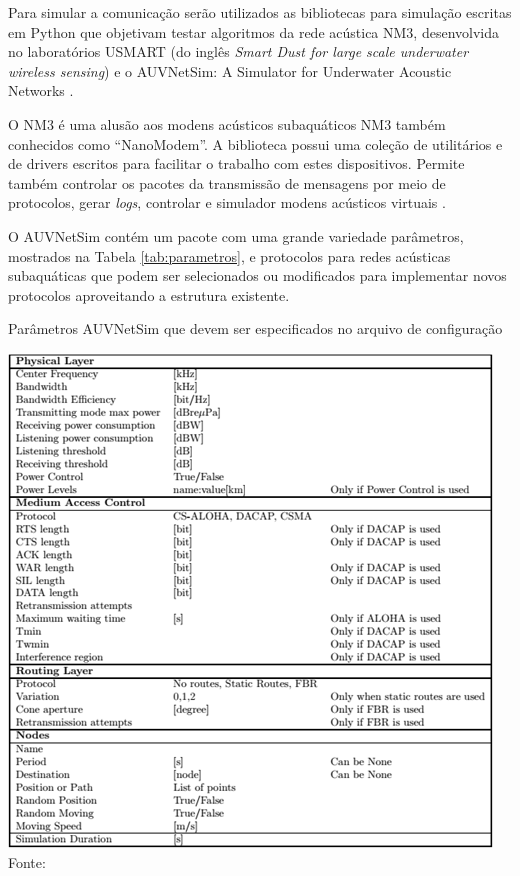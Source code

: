 Para simular a comunicação serão utilizados as bibliotecas para simulação escritas em Python que objetivam testar algoritmos da rede acústica NM3, desenvolvida no laboratórios USMART (do inglês \textit{Smart Dust for large scale underwater wireless sensing}) \cite{8248761} e o AUVNetSim: A Simulator for Underwater Acoustic Networks  \cite{montana2008auvnetsim}. 

O NM3 é uma alusão aos modens acústicos subaquáticos NM3 também conhecidos como “NanoModem”. A biblioteca possui uma coleção de utilitários e de drivers escritos para facilitar o trabalho com estes dispositivos. Permite também controlar os pacotes da transmissão de mensagens por meio de protocolos, gerar \textit{logs}, controlar e simulador modens acústicos virtuais \cite{SHERLOCK2019}.

O AUVNetSim contém um pacote com uma grande variedade parâmetros, mostrados na Tabela \ref{tab:parametros}, e protocolos para redes acústicas subaquáticas que podem ser selecionados ou modificados para implementar novos protocolos aproveitando a estrutura existente.

\begin{table}[h]
	\centering
	\caption[Parâmetros AUVNetSim que devem ser especificados no arquivo de configuração]{Parâmetros AUVNetSim que devem ser especificados no arquivo de configuração}
	\label{tab:parametros}
	\includegraphics[width=0.8\linewidth]{images/parametros}\\
	\footnotesize Fonte: \cite{montana2008auvnetsim}
\end{table}

